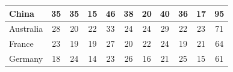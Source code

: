 \documentclass[12pt]{article}  %
\begin{document}
\begin{subappendices}
\begin{longtable}{|l|c|c|c|c|c|c|c|c|c|c|}
	\hline
	China                                                          & 35                                                                     & 35                                                                     & 15                                                                     & 46                                                                     & 38                                                                     & 20                                                                     & 40                        & 36                          & 17                          & 95                          \\ 
	\hline
	Australia                                                      & 28                                                                     & 20                                                                     & 22                                                                     & 33                                                                     & 24                                                                     & 24                                                                     & 29                        & 22                          & 23                          & 71                          \\ 
	\hline
	France                                                         & 23                                                                     & 19                                                                     & 19                                                                     & 27                                                                     & 20                                                                     & 22                                                                     & 24                        & 19                          & 21                          & 64                          \\ 
	\hline
	Germany                                                        & 18                                                                     & 24                                                                     & 14                                                                     & 23                                                                     & 26                                                                     & 16                                                                     & 21                        & 25                          & 15                          & 61                          \\ 

\end{longtable}
\end{subappendices}
\end{document}
